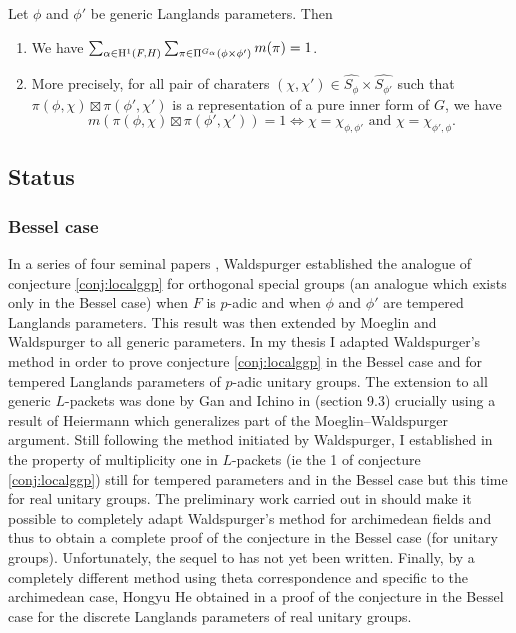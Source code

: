 \begin{conjecture}
\label{conj:localggp}
Let $\phi$ and $\phi'$ be generic Langlands parameters.
Then
\begin{enumerate}
    \item We have $\sum_{\alpha \in \mathrm{H}^1(F, H)} \sum_{\pi \in \Pi^{G_\alpha}(\phi \times \phi')} m(\pi) = 1$.
    \item More precisely, for all pair of charaters $(\chi, \chi') \in \widehat{S_\phi} \times \widehat{S_{\phi'}}$ such that $\pi(\phi, \chi) \boxtimes \pi(\phi', \chi')$ is a representation of a pure inner form of $G$, we have
    \[
        m(\pi(\phi, \chi) \boxtimes \pi(\phi', \chi')) = 1 \Leftrightarrow \chi = \chi_{\phi, \phi'}\text{ and }\chi = \chi_{\phi', \phi}.
    \]
\end{enumerate}
\end{conjecture}


\subsection{Status}

\subsubsection{Bessel case}

In a series of four seminal papers \cite{waldspurger1990demonstration,waldspurger2010formule,waldspurger2012calcul,waldspurger2012conjecture}, Waldspurger established the analogue of conjecture \ref{conj:localggp} for orthogonal special groups (an analogue which exists only in the Bessel case) when $F$ is $p$-adic and when $\phi$ and $\phi'$ are tempered Langlands parameters.
This result was then extended by Moeglin and Waldspurger \cite{moeglin2012conjecture} to all generic parameters.
In my thesis \cite{beuzart2014expression,beuzart2015endoscopie,beuzart2016conjecture} I adapted Waldspurger's method in order to prove conjecture \ref{conj:localggp} in the Bessel case and for tempered Langlands parameters of $p$-adic unitary groups.
The extension to all generic $L$-packets was done by Gan and Ichino in \cite{gan2016gross} (section 9.3) crucially using a result of Heiermann \cite{heiermann2016note} which generalizes part of the Moeglin--Waldspurger argument.
Still following the method initiated by Waldspurger, I established in \cite{beuzart2015local} the property of multiplicity one in $L$-packets (ie the 1 of conjecture \ref{conj:localggp}) still for tempered parameters and in the Bessel case but this time for real unitary groups. 
The preliminary work carried out in \cite{beuzart2015local} should make it possible to completely adapt Waldspurger's method for archimedean fields and thus to obtain a complete proof of the conjecture in the Bessel case (for unitary groups).
Unfortunately, the sequel to \cite{beuzart2015local} has not yet been written.
Finally, by a completely different method using theta correspondence and specific to the archimedean case, Hongyu He obtained in \cite{he2017gan} a proof of the conjecture in the Bessel case for the discrete Langlands parameters of real unitary groups.



